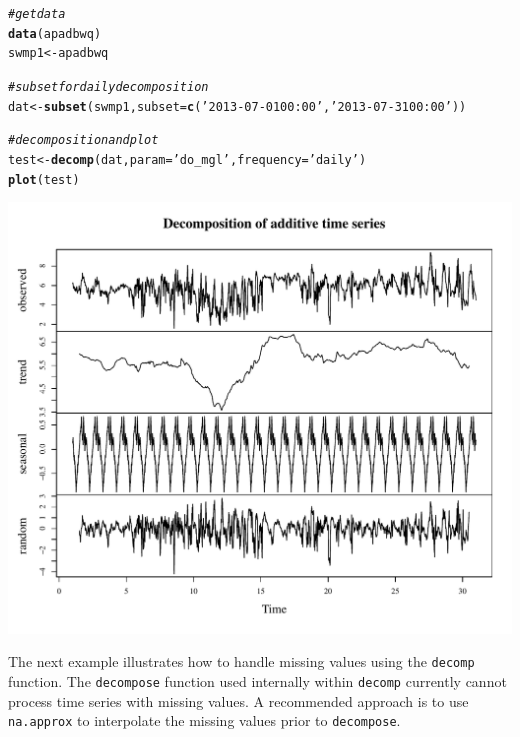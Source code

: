 \documentclass[10pt,letterpaper]{article}\usepackage[]{graphicx}\usepackage[]{color}
\makeatletter
\def\maxwidth{ %
  \ifdim\Gin@nat@width>\linewidth
    \linewidth
  \else
    \Gin@nat@width
  \fi
}
\newcommand{\hlstr}[1]{\textcolor[rgb]{0.192,0.494,0.8}{#1}}%
\newcommand{\hlcom}[1]{\textcolor[rgb]{0.678,0.584,0.686}{\textit{#1}}}%
\newcommand{\hlstd}[1]{\textcolor[rgb]{0.345,0.345,0.345}{#1}}%
\newcommand{\hlkwb}[1]{\textcolor[rgb]{0.69,0.353,0.396}{#1}}%
\newcommand{\hlkwc}[1]{\textcolor[rgb]{0.333,0.667,0.333}{#1}}%
\newcommand{\hlkwd}[1]{\textcolor[rgb]{0.737,0.353,0.396}{\textbf{#1}}}%
\newenvironment{kframe}{%
 \def\at@end@of@kframe{}%
 \ifinner\ifhmode%
  \def\at@end@of@kframe{\end{minipage}}%
  \begin{minipage}{\columnwidth}%
 \fi\fi%
 \def\FrameCommand##1{\hskip\@totalleftmargin \hskip-\fboxsep
 \colorbox{shadecolor}{##1}\hskip-\fboxsep
     \hskip-\linewidth \hskip-\@totalleftmargin \hskip\columnwidth}%
 \MakeFramed {\advance\hsize-\width
   \@totalleftmargin\z@ \linewidth\hsize
   \@setminipage}}%
 {\par\unskip\endMakeFramed%
 \at@end@of@kframe}
\newenvironment{knitrout}{}{} %
\makeatother
\begin{document}
\begin{knitrout}
\color{fgcolor}\begin{kframe}
\begin{alltt}
\hlcom{# get data}
\hlkwd{data}\hlstd{(apadbwq)}
\hlstd{swmp1} \hlkwb{<-} \hlstd{apadbwq}

\hlcom{# subset for daily decomposition}
\hlstd{dat} \hlkwb{<-} \hlkwd{subset}\hlstd{(swmp1,} \hlkwc{subset} \hlstd{=} \hlkwd{c}\hlstd{(}\hlstr{'2013-07-01 00:00'}\hlstd{,} \hlstr{'2013-07-31 00:00'}\hlstd{))}

\hlcom{# decomposition and plot}
\hlstd{test} \hlkwb{<-} \hlkwd{decomp}\hlstd{(dat,} \hlkwc{param} \hlstd{=} \hlstr{'do_mgl'}\hlstd{,} \hlkwc{frequency} \hlstd{=} \hlstr{'daily'}\hlstd{)}
\hlkwd{plot}\hlstd{(test)}
\end{alltt}
\end{kframe}

{\centering \includegraphics[width=\maxwidth]{figure/unnamed-chunk-17} 

}



\end{knitrout}

The next example illustrates how to handle missing values using the \texttt{decomp} function. The \texttt{decompose} function used internally within \texttt{decomp} currently cannot process time series with missing values.  A recommended approach is to use \texttt{na.approx} to interpolate the missing values prior to \texttt{decompose}.
\end{document}
